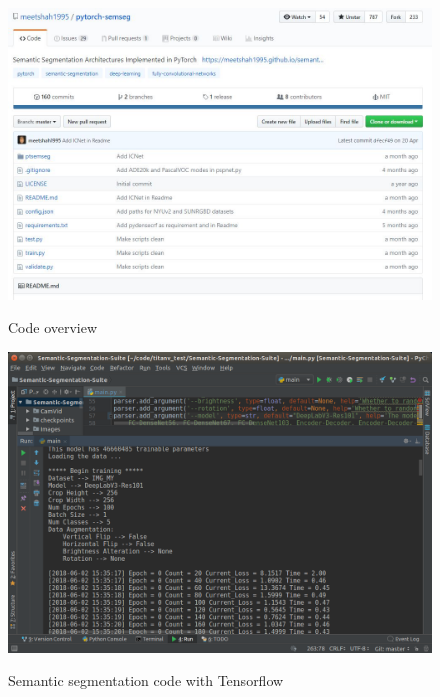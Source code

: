 \documentclass[]{IEEEtran}
\begin{document}
\begin{figure}[!hbt]
		\vspace{0.3cm}
		\begin{center}
			\includegraphics[width=\columnwidth]{code}
			\caption{Code overview}
			\label{fig:mp}
		    \hspace{0.5cm}
			\includegraphics[width=\columnwidth]{record}
			\caption{Semantic segmentation code with Tensorflow}
			\label{fig:ss}
		\end{center}
	\end{figure}
\end{document}
